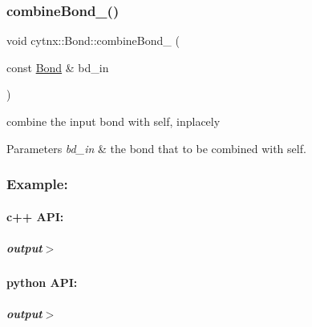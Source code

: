 \subsubsection{\texorpdfstring{combine\+Bond\+\_\+()}{combineBond\_()}}
{\footnotesize\ttfamily void cytnx\+::\+Bond\+::combine\+Bond\+\_\+ (\begin{DoxyParamCaption}\item[{const \hyperlink{classcytnx_1_1Bond}{Bond} \&}]{bd\+\_\+in }\end{DoxyParamCaption})\hspace{0.3cm}{\ttfamily [inline]}}



combine the input bond with self, inplacely 


\begin{DoxyParams}{Parameters}
{\em bd\+\_\+in} & the bond that to be combined with self.\\
\hline
\end{DoxyParams}
\subsubsection*{Example\+:}

\paragraph*{c++ A\+PI\+:}


\begin{DoxyCodeInclude}
\end{DoxyCodeInclude}
 \subparagraph*{output$>$}


\begin{DoxyVerbInclude}
\end{DoxyVerbInclude}
 \paragraph*{python A\+PI\+:}


\begin{DoxyCodeInclude}
\end{DoxyCodeInclude}
 \subparagraph*{output$>$}


\begin{DoxyVerbInclude}
\end{DoxyVerbInclude}
 \mbox{\label{classcytnx_1_1Bond_a4a1d060cf2d0c44d83356df757a802d1}} 
